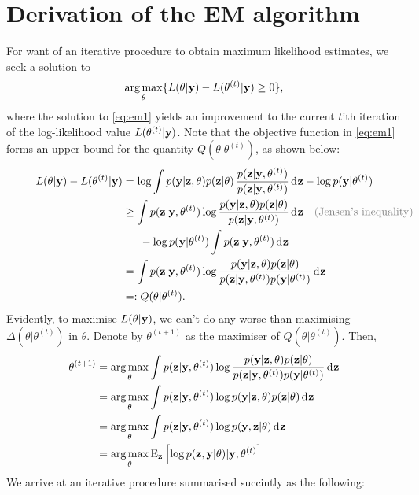 \section{Derivation of the EM algorithm}

For want of an iterative procedure to obtain maximum likelihood estimates, we seek a solution to 
\begin{equation}\label{eq:em1}
  \operatorname*{arg\,max}_\theta \{ L(\theta|{\mathbf y}) - L(\theta^{(t)}|{\mathbf y}) \geq 0 \},
\end{equation}
where the solution to \cref{eq:em1} yields an improvement to the current $t$'th iteration of the log-likelihood value $L(\theta^{(t)}|{\mathbf y})$.
Note that the objective function in \cref{eq:em1} forms an upper bound for the quantity $Q(\theta|\theta^{(t)})$, as shown below:
\begin{align*}
  L(\theta|\by) - L(\theta^{(t)}|\by)
  &= \log \int p(\by|\bz,\theta)p(\bz|\theta) \, \frac{p(\bz|\by,\theta^{(t)})}{p(\bz|\by,\theta^{(t)})}  \dint\bz - \log p(\by|\theta^{(t)}) \\
  &\geq \int p(\bz|\by,\theta^{(t)}) \log \frac{p(\by|\bz,\theta)p(\bz|\theta)}{p(\bz|\by,\theta^{(t)})} \dint\bz \mycomment{(Jensen's inequality)} \\
  &\phantom{==} - \log p(\by|\theta^{(t)})\int p(\bz|\by,\theta^{(t)}) \dint \bz \\
  &= \int p(\bz|\by,\theta^{(t)}) \log \frac{p(\by|\bz,\theta)p(\bz|\theta)}{p(\bz|\by,\theta^{(t)})p(\by|\theta^{(t)})} \dint\bz\\
  &=: Q(\theta|\theta^{(t)}).
\end{align*}
Evidently, to maximise $L(\theta|{\mathbf y})$, we can't do any worse than maximising $\Delta(\theta|\theta^{(t)})$ in $\theta$.
Denote by $\theta^{(t+1)}$ as the maximiser of $Q(\theta|\theta^{(t)})$. 
Then,
\begin{align*}
  \theta^{(t+1)}
  &= \operatorname*{arg\,max}_\theta \int p({\mathbf z}|{\mathbf y},\theta^{(t)}) \log \frac{p({\mathbf y}|{\mathbf z},\theta)p({\mathbf z}|\theta)}{p({\mathbf z}|{\mathbf y},\theta^{(t)})p({\mathbf y}|\theta^{(t)})} \operatorname{d}\hspace{0.5pt}\!{\mathbf z} \\
  &= \operatorname*{arg\,max}_\theta \int p({\mathbf z}|{\mathbf y},\theta^{(t)}) \log p({\mathbf y}|{\mathbf z},\theta)p({\mathbf z}|\theta) \operatorname{d}\hspace{0.5pt}\!{\mathbf z} \\
  &= \operatorname*{arg\,max}_\theta \int p({\mathbf z}|{\mathbf y},\theta^{(t)}) \log p({\mathbf y},{\mathbf z}|\theta) \operatorname{d}\hspace{0.5pt}\!{\mathbf z} \\
  &= \operatorname*{arg\,max}_\theta \operatorname{E}_{\mathbf z} \left[\log p({\mathbf z},{\mathbf y}|\theta) | {\mathbf y}, \theta^{(t)} \right] 
\end{align*}
We arrive at an iterative procedure summarised succintly as the following:

